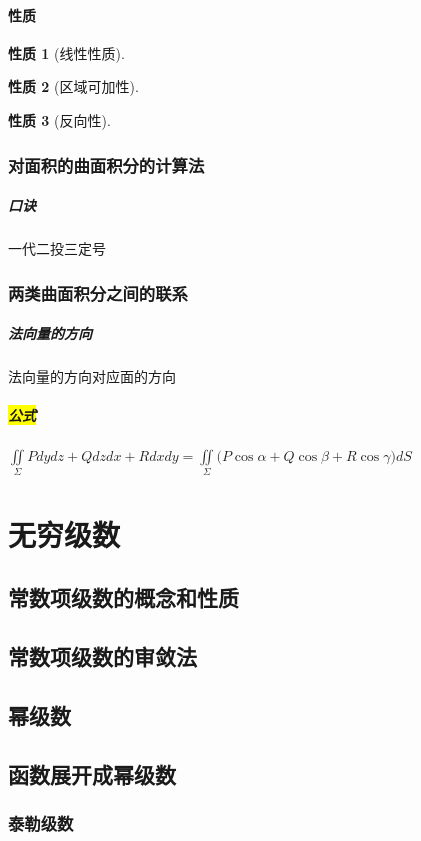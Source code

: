\documentclass[UTF8,a4paper,12pt,scheme=chinese]{ctexbook}
\newcommand{\hl}[1]{\colorbox{yellow}{#1}}
\theoremstyle{plain}
\newtheorem{property}{性质}[subsection]
\begin{document}
	\subsubsection{性质}
	\begin{property}[线性性质]
	\end{property}
	\begin{property}[区域可加性]
	\end{property}
	\begin{property}[反向性]
	\end{property}	
	\subsection{对面积的曲面积分的计算法}
	\paragraph{口诀}一代二投三定号
	\subsection{两类曲面积分之间的联系}
	\paragraph{法向量的方向}法向量的方向对应面的方向
	\paragraph{\hl{公式}}$\iint\limits_\Sigma  {Pdydz + Qdzdx + R}dxdy = \iint\limits_\Sigma  {(P\cos \alpha  + Q\cos \beta  + R}\cos \gamma )dS$
	\chapter{无穷级数}
	\section{常数项级数的概念和性质}
	\section{常数项级数的审敛法}
	\section{幂级数}
	\section{函数展开成幂级数}
	\subsection{泰勒级数}
\end{document}
